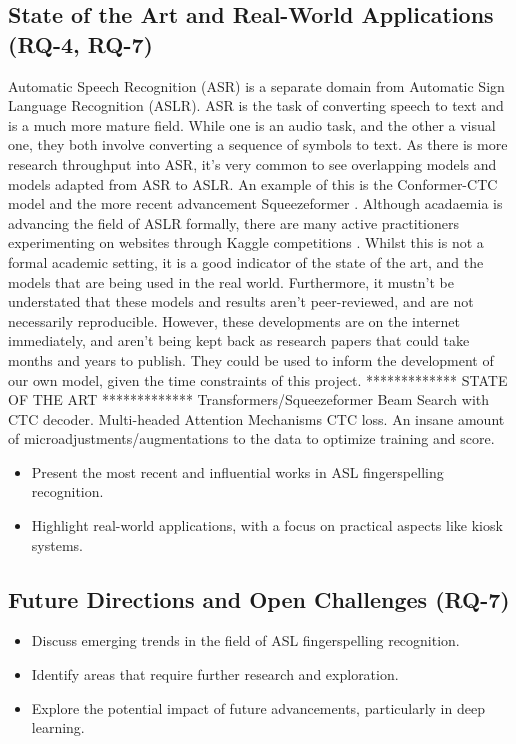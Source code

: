\subsection{State of the Art and Real-World Applications (RQ-4, RQ-7)}

Automatic Speech Recognition (ASR) is a separate domain from Automatic Sign Language Recognition (ASLR). ASR is the task of converting speech to text and is a much more mature field. While one is an audio task, and the other a visual one, they both involve converting a sequence of symbols to text. As there is more research throughput into ASR, it's very common to see overlapping models and models adapted from ASR to ASLR. An example of this is the Conformer-CTC model \cite{gulatiConformerConvolutionaugmentedTransformer2020} and the more recent advancement Squeezeformer \cite{kimSqueezeformerEfficientTransformer2022}. Although acadaemia is advancing the field of ASLR formally, there are many active practitioners experimenting on websites through Kaggle competitions \cite{kaggleAslFinger}. Whilst this is not a formal academic setting, it is a good indicator of the state of the art, and the models that are being used in the real world.
Furthermore, it mustn't be understated that these models and results aren't peer-reviewed, and are not necessarily reproducible. However, these developments are on the internet immediately, and aren't being kept back as research papers that could take months and years to publish. They could be used to inform the development of our own model, given the time constraints of this project.
************* STATE OF THE ART *************
Transformers/Squeezeformer
Beam Search with CTC decoder.
Multi-headed Attention Mechanisms
CTC loss.
An insane amount of microadjustments/augmentations to the data to optimize training and score.

\begin{itemize}
    \item Present the most recent and influential works in ASL fingerspelling recognition.
    \item Highlight real-world applications, with a focus on practical aspects like kiosk systems.
\end{itemize}

\subsection{Future Directions and Open Challenges (RQ-7)}

\begin{itemize}
    \item Discuss emerging trends in the field of ASL fingerspelling recognition.
    \item Identify areas that require further research and exploration.
    \item Explore the potential impact of future advancements, particularly in deep learning.
\end{itemize}

